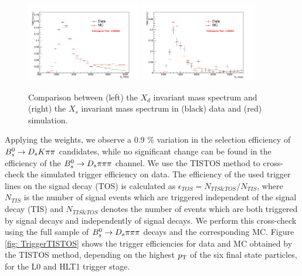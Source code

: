 \begin{figure}[h]
\includegraphics[height=6.cm,width=0.45\textwidth]{figs/Xd_Mass.pdf}
\includegraphics[height=6.cm,width=0.45\textwidth]{figs/Xs_Mass.pdf}
\caption{Comparison between (left) the $X_{d}$ invariant mass spectrum and (right) the $X_{s}$ invariant mass spectrum in (black) data and (red) simulation.}
\label{fig: XMasses}
\end{figure}


Applying the weights, we observe a 0.9 $\%$ variation in the selection efficiency of ${{B}^0_{s}}\rightarrow{\ensuremath{{D}_{s}}}{\ensuremath{K}}{\ensuremath{\pi}}{\ensuremath{\pi}}$ candidates, while no significant change can be found in the efficiency of the 
${{B}^0_{s}}\rightarrow{\ensuremath{{D}_{s}}}{\ensuremath{\pi}}{\ensuremath{\pi}}{\ensuremath{\pi}}$ channel. \newline  
We use the TISTOS method \cite{Tolk:1701134} to cross-check the simulated trigger efficiency on data. 
The efficiency of the used trigger lines on the signal decay (TOS) is calculated as $\epsilon_{TOS}=N_{TIS\&TOS}/N_{TIS}$, where $N_{TIS}$ is the number of signal events which are triggered independent of the signal decay (TIS) and
$N_{TIS\&TOS}$ denotes the number of events which are both triggered by signal decays and independently of signal decays.
We perform this cross-check using the full sample of ${{B}^0_{s}}\rightarrow{\ensuremath{{D}_{s}}}{\ensuremath{\pi}}{\ensuremath{\pi}}{\ensuremath{\pi}}$ decays and the corresponding MC.    
Figure \ref{fig: TriggerTISTOS} shows the trigger efficiencies for data and MC obtained by the TISTOS method, depending on the highest $\mbox{$p_{\mathrm{ T}}$}$ of the six final state particles, for the L0 and HLT1 trigger stage. 

